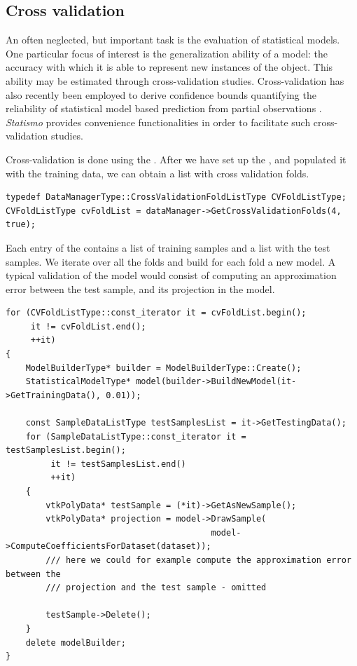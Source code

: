 \documentclass{InsightArticle}
\newcommand{\Statismo}{\emph{Statismo}\xspace}
\begin{document}
\subsection{Cross validation}
An often neglected, but important task is the evaluation of
statistical models. One particular focus of interest is the
generalization ability of a model: the accuracy with which it is able to represent new instances of the object. 
This ability may be estimated through cross-validation studies. Cross-validation has also recently been employed
to derive confidence bounds quantifying the reliability of statistical model based prediction from partial observations \cite{Remi, confidence region}. \Statismo provides convenience functionalities in order to facilitate such cross-validation studies. 

Cross-validation is done using the . 
After we have set up the , and populated it with the training data, we 
can obtain a list with cross validation folds. 
\begin{verbatim}
typedef DataManagerType::CrossValidationFoldListType CVFoldListType;
CVFoldListType cvFoldList = dataManager->GetCrossValidationFolds(4, true);
\end{verbatim}
Each entry of the  contains a list of training samples and a list with the test samples. 
We iterate over all the folds and build for each fold a new model. A typical validation of the model would 
consist of computing an approximation error between the test sample, and its projection in the model. 
\begin{verbatim}
for (CVFoldListType::const_iterator it = cvFoldList.begin();
     it != cvFoldList.end();
     ++it)
{
    ModelBuilderType* builder = ModelBuilderType::Create();
    StatisticalModelType* model(builder->BuildNewModel(it->GetTrainingData(), 0.01));

    const SampleDataListType testSamplesList = it->GetTestingData();
    for (SampleDataListType::const_iterator it = testSamplesList.begin();
         it != testSamplesList.end()
         ++it)
    {
        vtkPolyData* testSample = (*it)->GetAsNewSample();
        vtkPolyData* projection = model->DrawSample(
                                         model->ComputeCoefficientsForDataset(dataset));
        /// here we could for example compute the approximation error between the 
        /// projection and the test sample - omitted

        testSample->Delete();
    }
    delete modelBuilder;
}

\end{verbatim}
\end{document}
